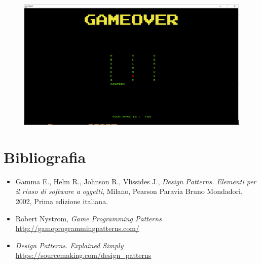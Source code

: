 \documentclass[a4paper,12pt, hidelinks]{report}
\begin{document}
\begin{figure}[H]
\centering{}
\includegraphics[width=\linewidth]{img/GameOver.png}
\label{img:GameOver}
\end{figure}

\chapter{Bibliografia}

\begin{itemize}
	\item Gamma E., Helm R., Johnson R., Vlissides J., \emph{Design Patterns. Elementi per il riuso di software a oggetti}, Milano, Pearson Paravia Bruno Mondadori, 2002, Prima edizione italiana.
	\item Robert Nystrom, \emph{Game Programming Patterns} \href{http://gameprogrammingpatterns.com/}{http://gameprogrammingpatterns.com/}
	\item \emph{Design Patterns. Explained Simply} \href{https://sourcemaking.com/design\_patterns}{https://sourcemaking.com/design\_patterns}

\end{itemize}
\end{document}
